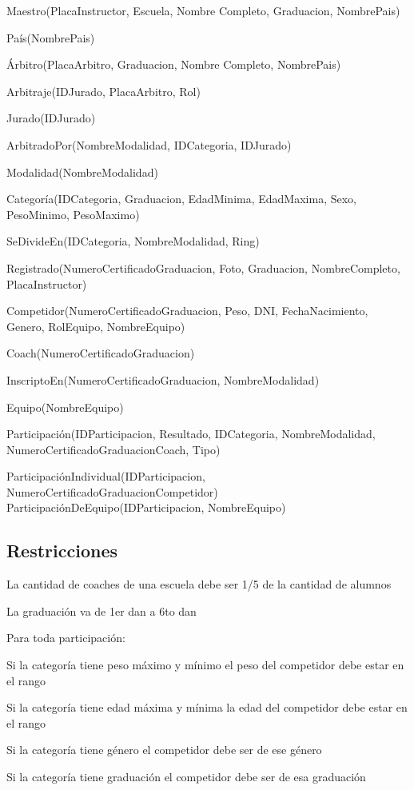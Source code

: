 \documentclass[a4paper]{article}
\begin{document}
Maestro(PlacaInstructor, Escuela, Nombre Completo, Graduacion, NombrePais)

País(NombrePais)

Árbitro(PlacaArbitro, Graduacion, Nombre Completo, NombrePais)

Arbitraje(IDJurado, PlacaArbitro, Rol)

Jurado(IDJurado)

ArbitradoPor(NombreModalidad, IDCategoria, IDJurado)

Modalidad(NombreModalidad)

Categoría(IDCategoria, Graduacion, EdadMinima, EdadMaxima, Sexo, PesoMinimo, PesoMaximo)

SeDivideEn(IDCategoria, NombreModalidad, Ring)

Registrado(NumeroCertificadoGraduacion, Foto,
Graduacion, NombreCompleto, PlacaInstructor)

Competidor(NumeroCertificadoGraduacion, Peso, DNI, FechaNacimiento, Genero, RolEquipo, NombreEquipo)

Coach(NumeroCertificadoGraduacion)

InscriptoEn(NumeroCertificadoGraduacion, NombreModalidad)

Equipo(NombreEquipo)

Participación(IDParticipacion, Resultado, IDCategoria, NombreModalidad, NumeroCertificadoGraduacionCoach, Tipo)

ParticipaciónIndividual(IDParticipacion, NumeroCertificadoGraduacionCompetidor)
ParticipaciónDeEquipo(IDParticipacion, NombreEquipo)

\subsection{Restricciones}

La cantidad de coaches de una escuela debe ser 1/5 de la cantidad de alumnos

La graduación va de 1er dan a 6to dan

Para toda participación:

Si la categoría tiene peso máximo y mínimo el peso del competidor debe estar en el rango

Si la categoría tiene edad máxima y mínima la edad del competidor debe estar en el rango

Si la categoría tiene género el competidor debe ser de ese género

Si la categoría tiene graduación el competidor debe ser de esa graduación
\end{document}
